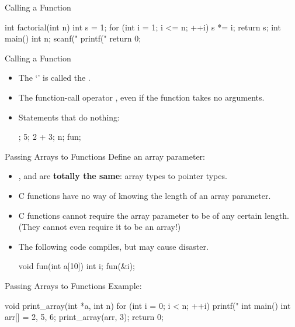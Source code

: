 \documentclass{beamer}
\begin{document}
\begin{frame}[fragile]{Calling a Function}
	\begin{cpp}
int factorial(int n) {
  int s = 1;
  for (int i = 1; i <= n; ++i)
    s *= i;
  return s;
}
int main() {
  int n;
  scanf("%
  printf("%
  return 0;
}
	\end{cpp}
\end{frame}

\begin{frame}[fragile]{Calling a Function}
	\begin{itemize}
		\item The `\bluett{()}' is called the .
		\item The function-call operator , even if the function takes no arguments.
		\pause
		\item Statements that do nothing:
		\begin{cpp}
;
5;
2 + 3;
{}
n;
fun;
		\end{cpp}
	\end{itemize}
\end{frame}

\begin{frame}[fragile]{Passing Arrays to Functions}
	Define an array parameter:
	\begin{itemize}
		\item {},  and  are \textbf{totally the same}: array types  to pointer types.
		\pause
		\item C functions have no way of knowing the length of an array parameter.
		\item C functions cannot require the array parameter to be of any certain length. (They cannot even require it to be an array!)
		\pause
		\item The following code compiles, but may cause disaster.
		\begin{cpp}
void fun(int a[10]) {}
int i;
fun(&i);
		\end{cpp}
	\end{itemize}
\end{frame}

\begin{frame}[fragile]{Passing Arrays to Functions}
	Example:
	\begin{cpp}
void print_array(int *a, int n) {
  for (int i = 0; i < n; ++i)
    printf("%
}
int main() {
  int arr[] = {2, 5, 6};
  print_array(arr, 3);
  return 0;
}
	\end{cpp}
\end{frame}
\end{document}
